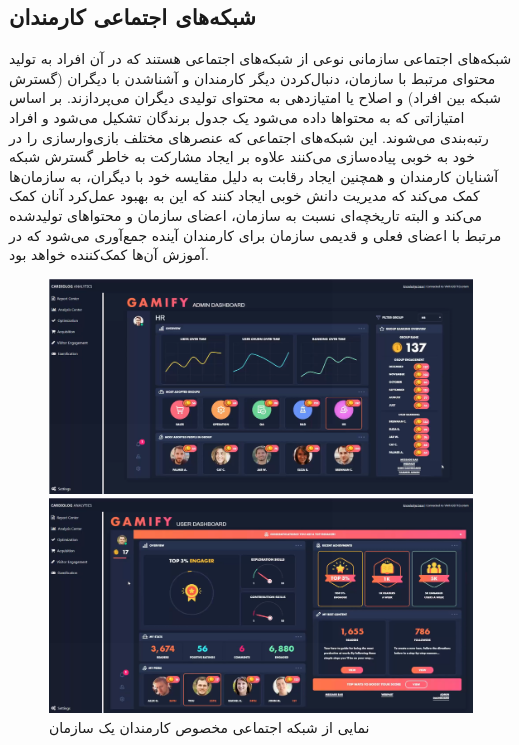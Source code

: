 \subsection{شبکه‌های اجتماعی کارمندان}
شبکه‌های اجتماعی سازمانی نوعی از شبکه‌های اجتماعی هستند که در آن افراد به تولید محتوای مرتبط با سازمان، دنبال‌کردن دیگر کارمندان و آشناشدن با دیگران (گسترش شبکه بین افراد) و اصلاح یا امتیازدهی به محتوای تولیدی دیگران می‌پردازند. بر اساس امتیازاتی که به محتواها داده می‌شود یک جدول برندگان تشکیل می‌شود و افراد رتبه‌بندی می‌شوند.
این شبکه‌های اجتماعی که عنصرهای مختلف بازی‌وارسازی را در خود به خوبی پیاده‌سازی می‌کنند علاوه بر ایجاد مشارکت به خاطر گسترش شبکه آشنایان کارمندان و همچنین ایجاد رقابت به دلیل مقایسه خود با دیگران، به سازمان‌ها کمک می‌کند که مدیریت دانش خوبی ایجاد کنند که این به بهبود عمل‌کرد آنان کمک می‌کند و البته تاریخچه‌ای نسبت به سازمان، اعضای سازمان و محتواهای تولیدشده مرتبط با اعضای فعلی و قدیمی سازمان برای کارمندان آینده جمع‌آوری می‌شود که در آموزش آن‌ها کمک‌کننده خواهد بود.

\begin{figure}[!htb]
	\centering
	\begin{minipage}[b]{0.49\textwidth}
		\includegraphics[width=\textwidth]{Figures/social1.png}
	\end{minipage}
	\begin{minipage}[b]{0.49\textwidth}
		\includegraphics[width=\textwidth]{Figures/social2.png}
	\end{minipage}
	\caption{نمایی از شبکه اجتماعی مخصوص کارمندان یک سازمان}
\end{figure}

